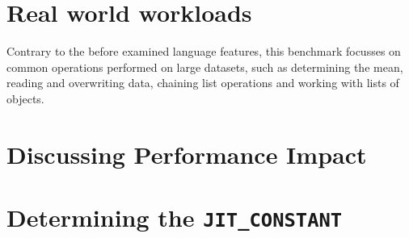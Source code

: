 \section{Real world workloads}

Contrary to the before examined language features, this benchmark focusses on
common operations performed on large datasets, such as determining the mean,
reading and overwriting data, chaining list operations and working with lists
of objects.


\section{Discussing Performance Impact} 

\section{Determining the \texttt{JIT\_CONSTANT}}
\label{sec:jit-constant-discussion}
